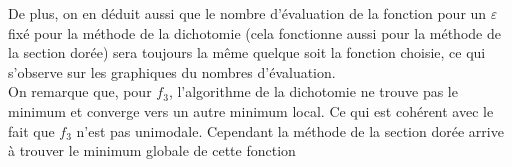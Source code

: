 \documentclass[12pt,a4paper]{article}
\begin{document}
De plus, on en déduit aussi que le nombre d'évaluation de la fonction pour un $\varepsilon$ fixé pour la méthode de la dichotomie (cela fonctionne aussi pour la méthode de la section dorée) sera toujours la même quelque soit la fonction choisie, ce qui s'observe sur les graphiques du nombres d'évaluation.\\

On remarque que, pour $f_3$, l'algorithme de la dichotomie ne trouve pas le minimum et converge vers un autre minimum local. Ce qui est cohérent avec le fait que $f_3$ n'est pas unimodale. Cependant la méthode de la section dorée arrive à trouver le minimum globale de cette fonction
\end{document}
